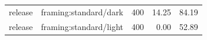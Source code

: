 \begin{longtable}{l>{\raggedright\arraybackslash}p{.42\linewidth}rrr}
release & %
framing:standard/dark & %
400 & %
14.25 & %
84.19 \\ %

release & %
framing:standard/light & %
400 & %
0.00 & %
52.89 \\ %


\end{longtable}
